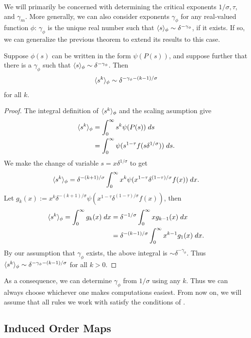 \documentclass[twoside,10pt]{article}
\begin{document}
We will primarily be concerned with determining the critical exponents $1/\sigma, \tau$, and $\gamma_{m}$. More generally, we can also consider exponents $\gamma_{\phi}$ for any real-valued function $\phi$: $\gamma_{\phi}$ is the unique real number such that $\langle s \rangle_{\phi}\sim \delta^{-\gamma_{\phi}}$, if it exists. If so, we can generalize the previous theorem to extend its results to this case.
\begin{thrm}[]
	\label{crit-exp-phi}
	Suppose $\phi(s)$ can be written in the form $\psi(P(s))$, and suppose further that there is a $\gamma_{\phi}$ such that $\langle s \rangle_{\phi} \sim \delta^{-\gamma_{\phi}}$. Then
	\[
		\langle s^{k} \rangle_{\phi} \sim \delta^{-\gamma_{\phi}-(k-1)/\sigma}
	\] for all $k$.
\end{thrm}
\begin{proof}
	The integral definition of $\langle s^{k} \rangle_{\phi}$ and the scaling asumption give
	\begin{align*}
		\langle s^{k} \rangle_{\phi} &= \int_{0}^{\infty} s^{k} \psi(P(s)) \;ds \\
				   &= \int_{0}^{\infty} \psi(s^{1-\tau}f(s \delta^{1/\sigma}))\;ds.
	\end{align*}
	We make the change of variable $s=x \delta^{1/\sigma}$ to get
	\[
	\langle s^{k} \rangle_{\phi} = \delta^{-(k+1)/\sigma} \int_{0}^{\infty} x^k \psi(x^{1-\tau} \delta^{(1-\tau)/\sigma} f(x))\;dx.
	\] Let $g_{k}(x) := x^{k} \delta^{-(k+1)/\sigma} \psi(x^{1-\tau} \delta^{(1-\tau)/\sigma} f(x))$, then
	\begin{align*}
		\langle s^{k} \rangle_{\phi} = \int_{0}^{\infty} g_{k}(x)\;dx &= \delta^{-1/\sigma} \int_{0}^{\infty} x g_{k-1}(x)\;dx \\
								    &= \delta^{-(k-1)/\sigma} \int_{0}^{\infty} x^{k-1} g_1(x)\;dx.
	\end{align*}
	By our assumption that $\gamma_{\phi}$ exists, the above integral is $\sim \delta^{-\gamma_{\phi}}$. Thus $\langle s^{k} \rangle_{\phi} \sim \delta^{-\gamma_{\phi} - (k-1)/\sigma}$ for all $k > 0$.
	
\end{proof}

As a consequence, we can determine $\gamma_{\phi}$ from $1/\sigma$ using any $k$. Thus we can always choose whichever one makes computations easiest. From now on, we will assume that all rules we work with satisfy the conditions of .

\subsection{Induced Order Maps}
\end{document}
